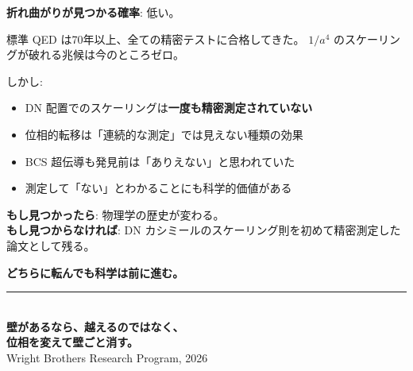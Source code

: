 \documentclass[12pt,a4paper]{article}
\begin{document}
\begin{honestbox}[確率の話]
\textbf{折れ曲がりが見つかる確率}: 低い。

標準 QED は70年以上、全ての精密テストに合格してきた。
$1/a^4$ のスケーリングが破れる兆候は今のところゼロ。

しかし:
\begin{itemize}
\item DN 配置でのスケーリングは\textbf{一度も精密測定されていない}
\item 位相的転移は「連続的な測定」では見えない種類の効果
\item BCS 超伝導も発見前は「ありえない」と思われていた
\item 測定して「ない」とわかることにも科学的価値がある
\end{itemize}

\textbf{もし見つかったら}: 物理学の歴史が変わる。\\
\textbf{もし見つからなければ}: DN カシミールのスケーリング則を初めて精密測定した論文として残る。

\textbf{どちらに転んでも科学は前に進む。}
\end{honestbox}

\vfill

\begin{center}
\rule{10cm}{0.4pt}\\[0.5cm]
{\Large\bfseries 壁があるなら、越えるのではなく、}\\[0.2cm]
{\Large\bfseries 位相を変えて壁ごと消す。}\\[0.3cm]
{\small Wright Brothers Research Program, 2026}
\end{center}
\end{document}

